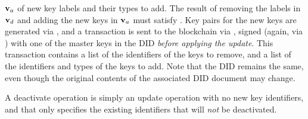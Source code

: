 \begin{description}
  $\mathbf{v}_a$ of new key labels and their types to add. The result of removing
  the labels in $\mathbf{v}_d$ and adding the new keys in $\mathbf{v}_a$ must satisfy
  \PAtala. Key pairs for the new keys are generated via \IdealFSig, and a
  transaction is sent to the blockchain via \IdealGdledger, signed (again, via
  \IdealFSig) with one of the master keys in the DID \emph{before applying the
    update}. This transaction contains a list of the identifiers of the keys to
  remove, and a list of the identifiers and types of the keys to add.
  Note that the DID remains the same, even though the original contents of
  the associated DID document may change.
\item[\uccmd{Deactivate}.] %
  A deactivate operation is simply an update operation with no new key
  identifiers, and that only specifies the existing identifiers that will
  \emph{not} be deactivated.
\end{description}

